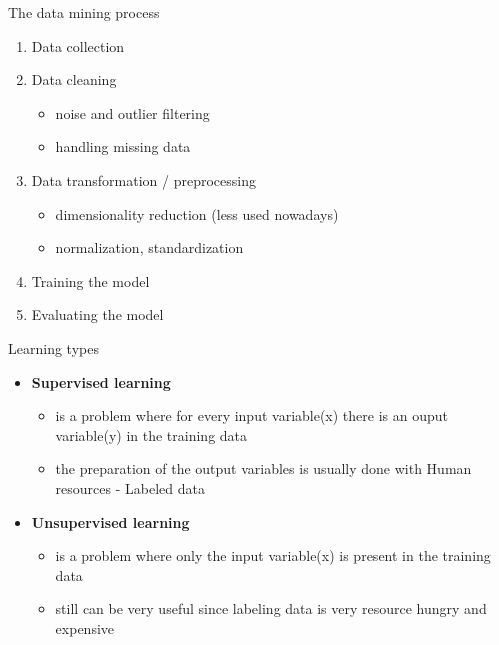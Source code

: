 \documentclass[bigger]{beamer}
\begin{document}
\begin{frame}{The data mining process}
    \begin{enumerate}
        \item Data collection
        \item Data cleaning
            \begin{itemize}
                \item noise and outlier filtering
                \item handling missing data
            \end{itemize}
        \item Data transformation / preprocessing
            \begin{itemize}
                \item dimensionality reduction (less used nowadays)
                \item normalization, standardization
            \end{itemize}
        \item Training the model
        \item Evaluating the model
    \end{enumerate}
\end{frame}

\begin{frame}{Learning types}
	\begin{itemize}
		\item \textbf{Supervised learning}
		\begin{itemize}
			\item is a problem where for every input variable(x) there is an ouput variable(y) in the training data
			\item the preparation of the output variables is usually done with Human resources - Labeled data
		\end{itemize}
		\item \textbf{Unsupervised learning}
		\begin{itemize}
			\item is a problem where only the input variable(x) is present in the training data
			\item still can be very useful since labeling data is very resource hungry and expensive
		\end{itemize}
	\end{itemize}
\end{frame}
\end{document}
